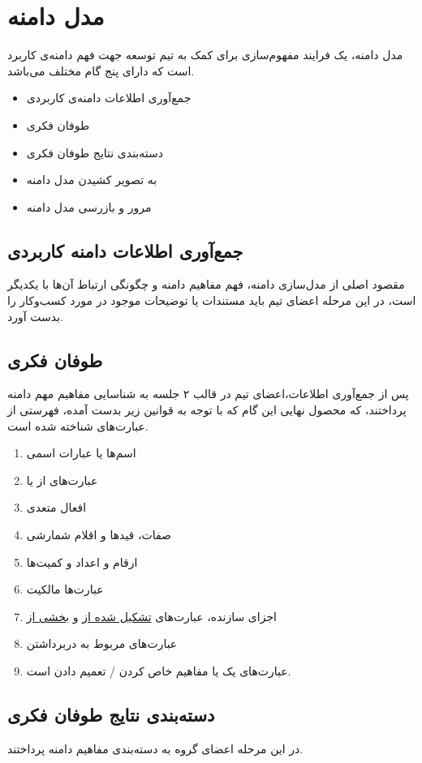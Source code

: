 \chapter{مدل دامنه}
مدل دامنه، یک فرایند مفهوم‌سازی برای کمک به تیم توسعه جهت فهم دامنه‌ی کاربرد است که دارای پنج گام مختلف می‌باشد.
\begin{itemize}
	\item
	جمع‌آوری اطلاعات دامنه‌‌ی کاربردی
	\item
	طوفان فکری
	\item
	دسته‌بندی نتایج طوفان فکری
	\item
	به تصویر کشیدن مدل دامنه
	\item
	مرور و بازرسی مدل دامنه
\end{itemize}

\section{جمع‌آوری اطلاعات دامنه کاربردی}
مقصود اصلی از مدل‌سازی دامنه، فهم مفاهیم دامنه و چگونگی ارتباط آن‌ها با یکدیگر است، در این مرحله اعضای تیم باید مستندات یا توضیحات موجود در مورد کسب‌و‌کار را بدست آورد.
\section{طوفان فکری}
پس از جمع‌آوری اطلاعات،‌اعضای تیم در قالب ۲ جلسه به شناسایی مفاهیم مهم دامنه پرداختند، که محصول نهایی این گام که با توجه به قوانین زیر بدست آمده، فهرستی از عبارت‌های شناخته شده است.
\begin{enumerate}
	\item
	اسم‌‌ها یا عبارات اسمی
	\item
	عبارت‌های
	 از 
	یا
	\item
	افعال متعدی
	\item
	صفات، قید‌‌ها و اقلام شمارشی
	\item
	ارقام و اعداد و کمیت‌ها
	\item
	عبارت‌ها مالکیت
	\item
	اجزای سازنده، عبارت‌های
	\underline{تشکیل شده از} و
	\underline{بخشی از}
	\item
	عبارت‌های مربوط به دربرداشتن
	\item
	عبارت‌های
	یک
	یا مفاهیم خاص کردن / تعمیم دادن است.
\end{enumerate}

\section{دسته‌بندی نتایج طوفان فکری}
در این مرحله اعضای گروه به دسته‌بندی مفاهیم دامنه پرداختند.

